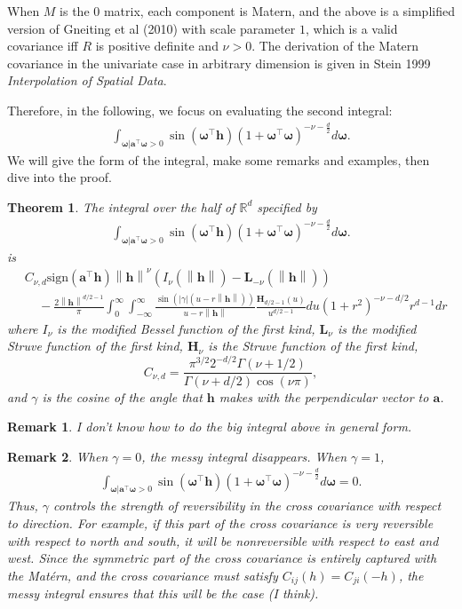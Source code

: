 \documentclass[11pt]{article}
\newtheorem{theorem}{Theorem}
\newtheorem*{remark}{Remark}
\newcommand{\vint}{\boldsymbol{\omega}}
\newcommand{\vpla}{\boldsymbol{a}}
\newcommand{\hh}{\left\lVert \boldsymbol{h}\right\rVert}
\begin{document}
When $M$ is the $0$ matrix, each component is Matern, and the above is a simplified version of Gneiting et al (2010) with scale parameter $1$, which is a valid covariance iff $R$ is positive definite and $\nu > 0$. The derivation of the Matern covariance in the univariate case in arbitrary dimension is given in Stein 1999 \textit{Interpolation of Spatial Data}.



 Therefore, in the following, we focus on evaluating the second integral: \begin{align}
\int_{\vint | \vpla^\top\vint > 0}\sin(\vint^\top \boldsymbol{h})(1 + \vint^\top \vint)^{-\nu- \frac{d}{2}} d\vint. \label{toughintegral}
\end{align}We will give the form of the integral, make some remarks and examples, then dive into the proof.

\begin{theorem}
The integral over the half of $\mathbb{R}^d$ specified by \begin{align}
\int_{\vint | \vpla^\top\vint > 0}\sin(\vint^\top \boldsymbol{h})(1 + \vint^\top \vint)^{-\nu- \frac{d}{2}} d\vint. \label{toughintegral}
\end{align} is \begin{align}
&C_{\nu, d}\textrm{sign}(\boldsymbol{a}^\top \boldsymbol{h}) \hh^{\nu}\left(I_\nu(\hh) - \boldsymbol{L}_{-\nu}(\hh)\right) \\
& \ \ \ \ \  -\frac{2\hh^{d/2 - 1}}{\pi}\int_0^\infty \int_{-\infty}^\infty \frac{\sin(|\gamma|(u-r\hh))}{u-r\hh}\frac{\boldsymbol{H}_{d/2 - 1}(u)}{u^{d/2-1}} du (1+ r^2)^{-\nu-d/2} r^{d-1}dr
\end{align}where $I_\nu$ is the modified Bessel function of the first kind, $\boldsymbol{L}_\nu$ is the modified Struve function of the first kind, $\boldsymbol{H}_\nu$ is the Struve function of the first kind, $$C_{\nu,d} = \frac{\pi^{3/2}2^{-d/2}\Gamma(\nu + 1/2)}{\Gamma(\nu + d/2) \cos(\nu\pi)},$$ and $\gamma$ is the cosine of the angle that $\boldsymbol{h}$ makes with the perpendicular vector to $\boldsymbol{a}$.
\end{theorem}

\begin{remark}
I don't know how to do the big integral above in general form. 
\end{remark}

\begin{remark}
When $\gamma=0$, the messy integral disappears. When $\gamma=1$, \begin{align*}
\int_{\vint | \vpla^\top\vint > 0}\sin(\vint^\top \boldsymbol{h})(1 + \vint^\top \vint)^{-\nu- \frac{d}{2}} d\vint =0.
\end{align*}Thus, $\gamma$ controls the strength of reversibility in the cross covariance with respect to direction. For example, if this part of the cross covariance is very reversible with respect to north and south, it will be nonreversible with respect to east and west. Since the symmetric part of the cross covariance is entirely captured with the Mat\'ern, and the cross covariance must satisfy $C_{ij}(h) = C_{ji}(-h)$, the messy integral ensures that this will be the case (I think).
\end{remark}
\end{document}
